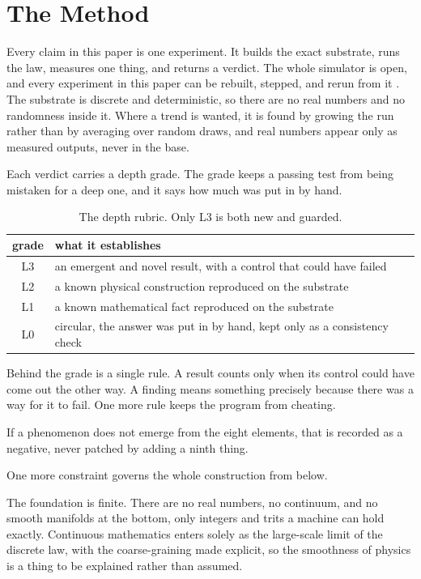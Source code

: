 \section{The Method}

Every claim in this paper is one experiment. It builds the exact substrate, runs the law, measures one thing, and returns a verdict. The whole simulator is open, and every experiment in this paper can be rebuilt, stepped, and rerun from it \cite{pollard2026vibetest}. The substrate is discrete and deterministic, so there are no real numbers and no randomness inside it. Where a trend is wanted, it is found by growing the run rather than by averaging over random draws, and real numbers appear only as measured outputs, never in the base.

Each verdict carries a depth grade. The grade keeps a passing test from being mistaken for a deep one, and it says how much was put in by hand.

\begin{table}[ht]
\centering
\begin{tabular}{@{}cp{}@{}}
\toprule
grade & what it establishes \\
\midrule
L3 & an emergent and novel result, with a control that could have failed \\
L2 & a known physical construction reproduced on the substrate \\
L1 & a known mathematical fact reproduced on the substrate \\
L0 & circular, the answer was put in by hand, kept only as a consistency check \\
\bottomrule
\end{tabular}
\caption{The depth rubric. Only L3 is both new and guarded.}
\label{tab:rubric}
\end{table}

Behind the grade is a single rule. A result counts only when its control could have come out the other way. A finding means something precisely because there was a way for it to fail. One more rule keeps the program from cheating.

\begin{principle}
If a phenomenon does not emerge from the eight elements, that is recorded as a negative, never patched by adding a ninth thing.
\end{principle}

One more constraint governs the whole construction from below.

\begin{principle}
The foundation is finite. There are no real numbers, no continuum, and no smooth manifolds at the bottom, only integers and trits a machine can hold exactly. Continuous mathematics enters solely as the large-scale limit of the discrete law, with the coarse-graining made explicit, so the smoothness of physics is a thing to be explained rather than assumed.
\end{principle}
